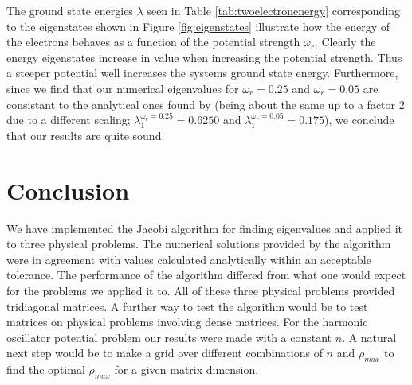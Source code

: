 \documentclass[twocolumn]{aastex62}
\begin{document}
The ground state energies $\lambda$ seen in Table \ref{tab:twoelectronenergy} corresponding to the eigenstates shown in Figure \ref{fig:eigenstates} illustrate how the energy of the electrons behaves as a function of the potential strength $\omega_r$. Clearly the energy eigenstates increase in value when increasing the potential strength. Thus a steeper potential well increases the systems ground state energy. Furthermore, since we find that our numerical eigenvalues for $\omega_r = 0.25$ and $\omega_r = 0.05$ are consistant to the analytical ones found by \cite{taut:1993} (being about the same up to a factor 2 due to a different scaling; $\lambda_1^{\omega_r = 0.25} = 0.6250$ and $\lambda_1^{\omega_r = 0.05} = 0.175$), we conclude that our results are quite sound.

\section{Conclusion} \label{sec:conclusion}
We have implemented the Jacobi algorithm for finding eigenvalues and applied it to three physical problems. The numerical solutions provided by the algorithm were in agreement with values calculated analytically within an acceptable tolerance. The performance of the algorithm differed from what one would expect for the problems we applied it to. All of these three physical problems provided tridiagonal matrices. A further way to test the algorithm would be to test matrices on physical problems involving dense matrices. For the harmonic oscillator potential problem our results were made with a constant $n$. A natural next step would be to make a grid over different combinations of $n$ and $\rho_{max}$ to find the optimal $\rho_{max}$ for a given matrix dimension.





\end{document}
